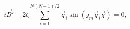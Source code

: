 \begin{equation}
\label{sp2}
i\vec B'-2\zeta\sum\limits_{i=1}^{N(N-1)/2}\vec q_i\sin\left(g_m\vec q_i\vec\chi\right)=0,
\end{equation}

